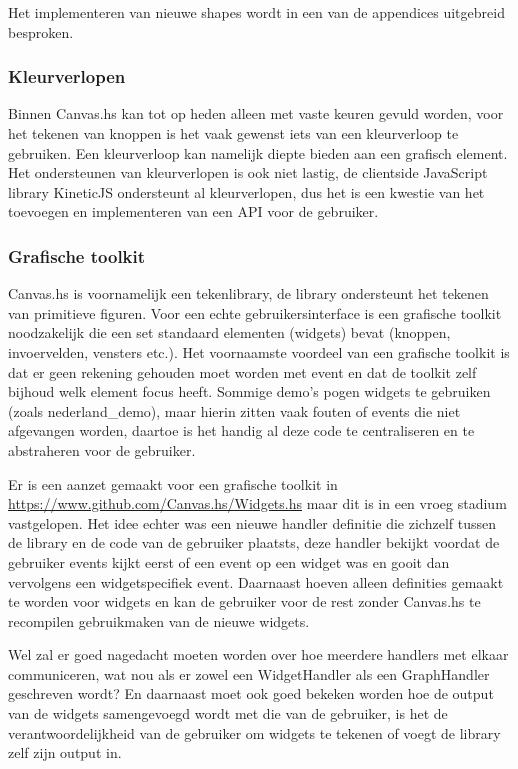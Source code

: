 Het implementeren van nieuwe shapes wordt in een van de appendices uitgebreid besproken.

\subsubsection{Kleurverlopen}
Binnen Canvas.hs kan tot op heden alleen met vaste keuren gevuld worden, voor het tekenen van knoppen is het vaak gewenst iets van een kleurverloop te gebruiken. Een kleurverloop kan namelijk diepte bieden aan een grafisch element. Het ondersteunen van kleurverlopen is ook niet lastig, de clientside JavaScript library KineticJS ondersteunt al kleurverlopen, dus het is een kwestie van het toevoegen en implementeren van een API voor de gebruiker.

\subsubsection{Grafische toolkit}
Canvas.hs is voornamelijk een tekenlibrary, de library ondersteunt het tekenen van primitieve figuren. Voor een echte gebruikersinterface is een grafische toolkit noodzakelijk die een set standaard elementen (widgets) bevat (knoppen, invoervelden, vensters etc.). Het voornaamste voordeel van een grafische toolkit is dat er geen rekening gehouden moet worden met event en dat de toolkit zelf bijhoud welk element focus heeft. Sommige demo's pogen widgets te gebruiken (zoals nederland\_demo), maar hierin zitten vaak fouten of events die niet afgevangen worden, daartoe is het handig al deze code te centraliseren en te abstraheren voor de gebruiker.

Er is een aanzet gemaakt voor een grafische toolkit in \url{https://www.github.com/Canvas.hs/Widgets.hs} maar dit is in een vroeg stadium vastgelopen. Het idee echter was een nieuwe handler definitie die zichzelf tussen de library en de code van de gebruiker plaatsts, deze handler bekijkt voordat de gebruiker events kijkt eerst of een event op een widget was en gooit dan vervolgens een widgetspecifiek event. Daarnaast hoeven alleen definities gemaakt te worden voor widgets en kan de gebruiker voor de rest zonder Canvas.hs te recompilen gebruikmaken van de nieuwe widgets.

Wel zal er goed nagedacht moeten worden over hoe meerdere handlers met elkaar communiceren, wat nou als er zowel een WidgetHandler als een GraphHandler geschreven wordt? En daarnaast moet ook goed bekeken worden hoe de output van de widgets samengevoegd wordt met die van de gebruiker, is het de verantwoordelijkheid van de gebruiker om widgets te tekenen of voegt de library zelf zijn output in.

